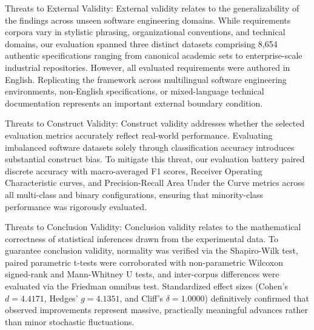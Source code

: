 Threats to External Validity: External validity relates to the generalizability of the findings across unseen software engineering domains. While requirements corpora vary in stylistic phrasing, organizational conventions, and technical domains, our evaluation spanned three distinct datasets comprising 8,654 authentic specifications ranging from canonical academic sets to enterprise-scale industrial repositories. However, all evaluated requirements were authored in English. Replicating the framework across multilingual software engineering environments, non-English specifications, or mixed-language technical documentation represents an important external boundary condition.

Threats to Construct Validity: Construct validity addresses whether the selected evaluation metrics accurately reflect real-world performance. Evaluating imbalanced software datasets solely through classification accuracy introduces substantial construct bias. To mitigate this threat, our evaluation battery paired discrete accuracy with macro-averaged F1 scores, Receiver Operating Characteristic curves, and Precision-Recall Area Under the Curve metrics across all multi-class and binary configurations, ensuring that minority-class performance was rigorously evaluated.

Threats to Conclusion Validity: Conclusion validity relates to the mathematical correctness of statistical inferences drawn from the experimental data. To guarantee conclusion validity, normality was verified via the Shapiro-Wilk test, paired parametric t-tests were corroborated with non-parametric Wilcoxon signed-rank and Mann-Whitney U tests, and inter-corpus differences were evaluated via the Friedman omnibus test. Standardized effect sizes (Cohen's $d = 4.4171$, Hedges' $g = 4.1351$, and Cliff's $\delta = 1.0000$) definitively confirmed that observed improvements represent massive, practically meaningful advances rather than minor stochastic fluctuations.

